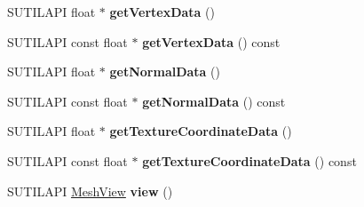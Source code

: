 \begin{DoxyCompactItemize}
S\+U\+T\+I\+L\+A\+PI float $\ast$ {\bfseries get\+Vertex\+Data} ()
\item 
\mbox{\label{class_device_mesh_storage_a762f2f3164413b170a19b29830f52b2c}} 
S\+U\+T\+I\+L\+A\+PI const float $\ast$ {\bfseries get\+Vertex\+Data} () const
\item 
\mbox{\label{class_device_mesh_storage_a28dca83f4d3ae78b9ae2b7ef7a56e6df}} 
S\+U\+T\+I\+L\+A\+PI float $\ast$ {\bfseries get\+Normal\+Data} ()
\item 
\mbox{\label{class_device_mesh_storage_ae23197fbc7a54cd3d29e94dde0f14f2e}} 
S\+U\+T\+I\+L\+A\+PI const float $\ast$ {\bfseries get\+Normal\+Data} () const
\item 
\mbox{\label{class_device_mesh_storage_a41a162aa6974c6dac6512db488572438}} 
S\+U\+T\+I\+L\+A\+PI float $\ast$ {\bfseries get\+Texture\+Coordinate\+Data} ()
\item 
\mbox{\label{class_device_mesh_storage_ae24b455728b1492ca0ee410b7ed27c17}} 
S\+U\+T\+I\+L\+A\+PI const float $\ast$ {\bfseries get\+Texture\+Coordinate\+Data} () const
\item 
\mbox{\label{class_device_mesh_storage_a515a39bfd1474ee493e1f8760b3c988e}} 
S\+U\+T\+I\+L\+A\+PI \hyperlink{struct_mesh_view}{Mesh\+View} {\bfseries view} ()
\end{DoxyCompactItemize}
